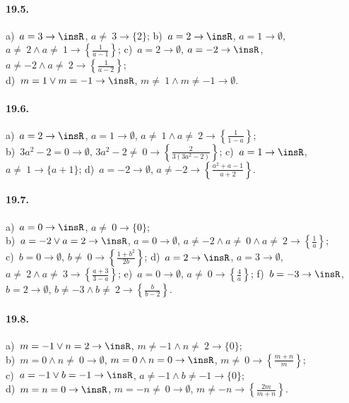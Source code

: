 \paragraph{19.5.}
a)~$a=3 \rightarrow \insR$, $a\neq~3 \rightarrow \{2\}$;
\quad b)~$a=2 \rightarrow \insR$, $a=1 \rightarrow \emptyset$, $a\neq~2\wedge a\neq~1 \rightarrow \left\{\frac{1}{a-1}\right\}$;
\quad c)~$a=2 \rightarrow \emptyset$, $a=-2 \rightarrow \insR$, $a\neq -2\wedge a\neq~2 \rightarrow \left\{\frac{1}{a-2}\right\}$;
\quad\protect\\
d)~$m=1\vee m=-1 \rightarrow \insR$, $m\neq~1\wedge m\neq -1 \rightarrow \emptyset$.

\paragraph{19.6.}
a)~$a=2 \rightarrow \insR$, $a=1 \rightarrow \emptyset$, $a\neq~1\wedge a\neq~2 \rightarrow \left\{\frac{1}{1-a}\right\}$;
\quad\protect\\
b)~$3a^{2}-2=0 \rightarrow \emptyset$, $3a^{2}-2\neq~0 \rightarrow \left\{\frac{2}{3(3a^{2}-2)}\right\}$;
\quad c)~$a=1 \rightarrow \insR$, $a\neq~1 \rightarrow \{a+1\}$;
\quad d)~$a=-2 \rightarrow \emptyset$, $a\neq -2 \rightarrow \left\{\frac{a^{2}+a-1}{a+2}\right\}$.

\paragraph{19.7.}
a)~$a=0 \rightarrow \insR$, $a\neq~0 \rightarrow \{0\}$;
\quad \protect\\
b)~$a=-2\vee a=2 \rightarrow \insR$, $a=0 \rightarrow \emptyset$, $a\neq -2\wedge a\neq~0\wedge a\neq~2 \rightarrow \left\{\frac{1}{a}\right\}$;
\quad\protect\\
c)~$b=0 \rightarrow \emptyset$, $b\neq~0 \rightarrow \left\{\frac{1+b^{2}}{2b}\right\}$;
\quad d)~$a=2 \rightarrow \insR$, $a=3 \rightarrow \emptyset$, $a\neq~2\wedge a\neq~3 \rightarrow \left\{\frac{a+3}{3-a}\right\}$;
\quad e)~$a=0 \rightarrow \emptyset$, $a\neq~0 \rightarrow \left\{\frac{4}{a}\right\}$;
\quad f)~$b=-3 \rightarrow \insR$, $b=2 \rightarrow \emptyset$, $b\neq -3\wedge b\neq~2 \rightarrow \left\{\frac{b}{b-2}\right\}$.

\paragraph{19.8.}
a)~$m=-1\vee n=2 \rightarrow \insR$, $m\neq -1\wedge n\neq~2 \rightarrow \{0\}$;
\protect\\
b)~$m=0\wedge n\neq~0 \rightarrow \emptyset$, $m=0\wedge n=0 \rightarrow \insR$, $m\neq~0 \rightarrow \left\{\frac{m+n}{m}\right\}$;
\protect\\
c)~$a=-1\vee b=-1 \rightarrow \insR$, $a\neq -1\wedge b\neq -1 \rightarrow \{0\}$;
\protect\\ d)~$m=n=0 \rightarrow \insR$, $m=-n\neq~0 \rightarrow \emptyset$, $m\neq -n \rightarrow \left\{\frac{2m}{m+n}\right\}$.

